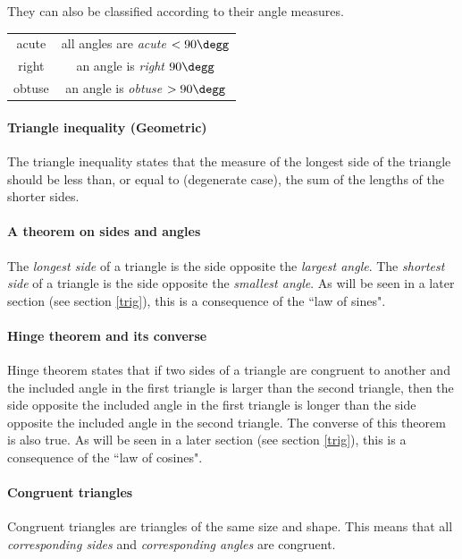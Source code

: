 They can also be classified according to their angle measures.

\begin{table}[h!]
    \centering
    \begin{tabular}{c|c}
        acute & all angles are \emph{acute} $< 90\degg$ \\
        right & an angle is \emph{right} $90\degg$ \\
        obtuse & an angle is \emph{obtuse} $> 90\degg$ 
    \end{tabular}
\end{table}

\paragraph{Triangle inequality (Geometric)}
The triangle inequality states that the measure of the longest side of the triangle should be less than, or equal to (degenerate case), the sum of the lengths of the shorter sides.

\paragraph{A theorem on sides and angles}
The \emph{longest side} of a triangle is the side opposite the \emph{largest angle}.
The \emph{shortest side} of a triangle is the side opposite the \emph{smallest angle}.
As will be seen in a later section (see section \ref{trig}), this is a consequence of the ``law of sines".

\paragraph{Hinge theorem and its converse}
Hinge theorem states that if two sides of a triangle are congruent to another and the included angle in the first triangle is larger than the second triangle, then the side opposite the included angle in the first triangle is longer than the side opposite the included angle in the second triangle.
The converse of this theorem is also true.
As will be seen in a later section (see section \ref{trig}), this is a consequence of the ``law of cosines".

\paragraph{Congruent triangles}
Congruent triangles are triangles of the same size and shape.
This means that all \emph{corresponding sides} and \emph{corresponding angles} are congruent.

